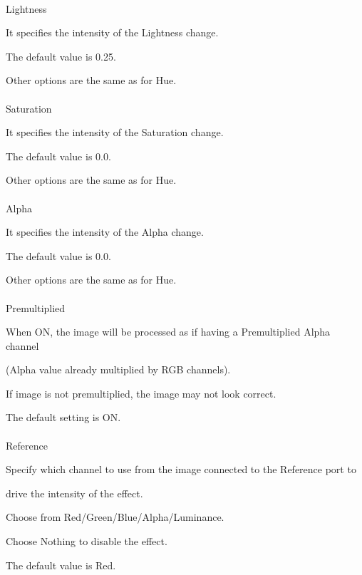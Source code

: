 \documentclass[a4paper,12pt]{article}
\begin{document}
\thispagestyle{empty}

\ \vspace{-0.2em}
\\
Lightness\par
It specifies the intensity of the Lightness change.\par
The default value is 0.25.\par
Other options are the same as for \textquotedbl Hue\textquotedbl .\\
\\
Saturation\par
It specifies the intensity of the Saturation change.\par
The default value is 0.0.\par
Other options are the same as for \textquotedbl Hue\textquotedbl .\\
\\
Alpha\par
It specifies the intensity of the Alpha change.\par
The default value is 0.0.\par
Other options are the same as for \textquotedbl Hue\textquotedbl .\\
\\
Premultiplied\par
When ON, the image will be processed as if having a Premultiplied Alpha channel\par 
(Alpha value already multiplied by RGB channels).\par
If image is not premultiplied, the image may not look correct.\par
The default setting is ON.\\
\\
Reference\par
Specify which channel to use from the image connected to the Reference port to\par 
drive the intensity of the effect.\par
Choose from Red/Green/Blue/Alpha/Luminance.\par
Choose Nothing to disable the effect.\par
The default value is \textquotedbl Red\textquotedbl .
\end{document}
